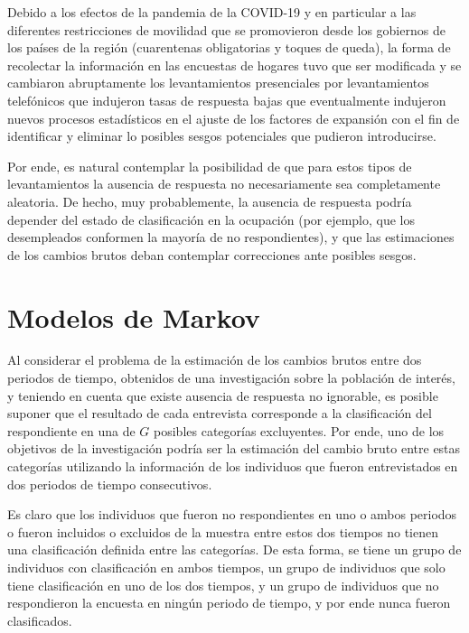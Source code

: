 \documentclass[
  10pt,
  spanish,
]{book}
\begin{document}
Debido a los efectos de la pandemia de la COVID-19 y en particular a las diferentes restricciones de movilidad que se promovieron desde los gobiernos de los países de la región (cuarentenas obligatorias y toques de queda), la forma de recolectar la información en las encuestas de hogares tuvo que ser modificada y se cambiaron abruptamente los levantamientos presenciales por levantamientos telefónicos que indujeron tasas de respuesta bajas que eventualmente indujeron nuevos procesos estadísticos en el ajuste de los factores de expansión con el fin de identificar y eliminar lo posibles sesgos potenciales que pudieron introducirse.

Por ende, es natural contemplar la posibilidad de que para estos tipos de levantamientos la ausencia de respuesta no necesariamente sea completamente aleatoria. De hecho, muy probablemente, la ausencia de respuesta podría depender del estado de clasificación en la ocupación (por ejemplo, que los desempleados conformen la mayoría de no respondientes), y que las estimaciones de los cambios brutos deban contemplar correcciones ante posibles sesgos.

\hypertarget{modelos-de-markov}{%
\section{Modelos de Markov}\label{modelos-de-markov}}

Al considerar el problema de la estimación de los cambios brutos entre dos periodos de tiempo, obtenidos de una investigación sobre la población de interés, y teniendo en cuenta que existe ausencia de respuesta no ignorable, es posible suponer que el resultado de cada entrevista corresponde a la clasificación del respondiente en una de \(G\) posibles categorías excluyentes. Por ende, uno de los objetivos de la investigación podría ser la estimación del cambio bruto entre estas categorías utilizando la información de los individuos que fueron entrevistados en dos periodos de tiempo consecutivos.

Es claro que los individuos que fueron no respondientes en uno o ambos periodos o fueron incluidos o excluidos de la muestra entre estos dos tiempos no tienen una clasificación definida entre las categorías. De esta forma, se tiene un grupo de individuos con clasificación en ambos tiempos, un grupo de individuos que solo tiene clasificación en uno de los dos tiempos, y un grupo de individuos que no respondieron la encuesta en ningún periodo de tiempo, y por ende nunca fueron clasificados.
\end{document}
